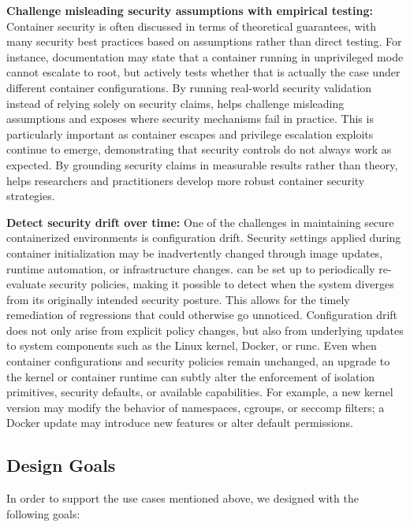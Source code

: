 \noindent\textbf{Challenge misleading security assumptions with empirical testing:}
Container security is often discussed in terms of theoretical guarantees, with many security best practices based on assumptions rather than direct testing. For instance, documentation may state that a container running in unprivileged mode cannot escalate to root, but \houdini actively tests whether that is actually the case under different container configurations. By running real-world security validation instead of relying solely on security claims, \houdini helps challenge misleading assumptions and exposes where security mechanisms fail in practice. This is particularly important as container escapes and privilege escalation exploits continue to emerge, demonstrating that security controls do not always work as expected. By grounding security claims in measurable results rather than theory, \houdini helps researchers and practitioners develop more robust container security strategies.

\noindent\textbf{Detect security drift over time:} One of the challenges in maintaining secure containerized environments is configuration drift. Security settings applied during container initialization may be inadvertently changed through image updates, runtime automation, or infrastructure changes. \houdini can be set up to periodically re-evaluate security policies, making it possible to detect when the system diverges from its originally intended security posture. This allows for the timely remediation of regressions that could otherwise go unnoticed. Configuration drift does not only arise from explicit policy changes, but also from underlying updates to system components such as the Linux kernel, Docker, or runc. Even when container configurations and security policies remain unchanged, an upgrade to the kernel or container runtime can subtly alter the enforcement of isolation primitives, security defaults, or available capabilities. For example, a new kernel version may modify the behavior of namespaces, cgroups, or seccomp filters; a Docker update may introduce new features or alter default permissions.

\subsection{Design Goals}
In order to support the use cases mentioned above, we designed \houdini with the following goals:

